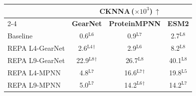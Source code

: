 \begin{tabular}{lccc}
\toprule
 & \multicolumn{3}{c}{\textbf{CKNNA\,($\times 10^{3}$)\,$\uparrow$}} \\
\cmidrule(lr){2-4}
 & \textbf{GearNet} & \textbf{ProteinMPNN} & \textbf{ESM2} \\
\midrule
Baseline & 0.6$^{\text{L6}}$ & 0.9$^{\text{L7}}$ & 2.7$^{\text{L8}}$ \\
REPA L4-GearNet & 2.6$^{\text{L4}}$$^{\dagger}$ & 2.9$^{\text{L6}}$ & 8.2$^{\text{L8}}$ \\
REPA L9-GearNet & 22.9$^{\text{L8}}$$^{\dagger}$ & 26.7$^{\text{L8}}$ & 40.1$^{\text{L8}}$ \\
REPA L4-MPNN & 4.8$^{\text{L7}}$ & 16.6$^{\text{L7}}$$^{\dagger}$ & 19.8$^{\text{L5}}$ \\
REPA L9-MPNN & 5.0$^{\text{L7}}$ & 14.2$^{\text{L6}}$$^{\dagger}$ & 14.2$^{\text{L7}}$ \\
\bottomrule
\end{tabular}
